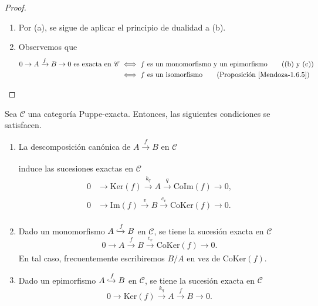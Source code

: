 \documentclass[tesis]{subfiles}
\begin{document}
\begin{proof}
\begin{enumerate}[label=(\alph*)]
        \item Por (a), se sigue de aplicar el principio de dualidad a (b).

        \item Observemos que
            \begin{align*}
                0\to A\xrightarrow[]{f} B\to 0 \text{ es exacta en } \mathscr{C} &\iff f \text{ es un monomorfismo y un epimorfismo} \tag{(b) y (c)} \\
                                                                                 &\iff f \text{ es un isomorfismo} \tag{Proposición \ref{Mendoza-1.6.5}}
            \end{align*}
    \end{enumerate}
\end{proof}

\begin{Coro}\label{Mendoza-1.7.4}
    Sea $\mathscr{C}$ una categoría Puppe-exacta. Entonces, las siguientes condiciones se satisfacen.

    \begin{enumerate}[label=(\alph*)]
    
        \item La descomposición canónica de $A\xrightarrow[]{f}B$ en $\mathscr{C}$
            \begin{center}
            \end{center}
            induce las sucesiones exactas en $\mathscr{C}$
            \begin{align*}
                0 &\to \text{Ker}(f) \xrightarrow[]{k_q} A \xrightarrow[]{q} \text{CoIm}(f) \to 0, \\
                0 &\to \text{Im}(f) \xrightarrow[]{v} B \xrightarrow[]{c_v} \text{CoKer}(f) \to 0.
            \end{align*}

        \item Dado un monomorfismo $A\xhookrightarrow{f} B$ en $\mathscr{C}$, se tiene la sucesión exacta en $\mathscr{C}$
            \[
            0\to A\xrightarrow[]{f} B\xrightarrow[]{c_v} \text{CoKer}(f) \to 0.
            \] 
            En tal caso, frecuentemente escribiremos $B/A$ en vez de $\text{CoKer}(f)$.
            
        \item Dado un epimorfismo $A\xhookrightarrow{f} B$ en $\mathscr{C}$, se tiene la sucesión exacta en $\mathscr{C}$
            \[
            0\to \text{Ker}(f) \xrightarrow[]{k_q} A \xrightarrow[]{f} B\to 0.
            \] 
    \end{enumerate}
\end{Coro}
\end{document}
